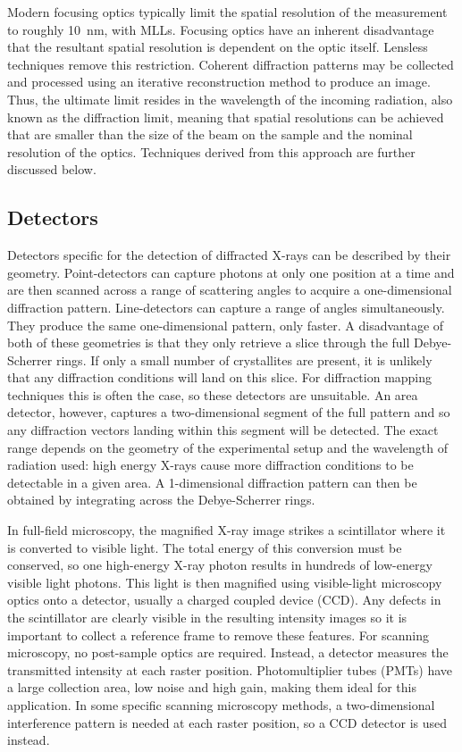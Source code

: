 \documentclass[journal=cmatex,manuscript=perspective]{achemso}
\begin{document}
Modern focusing optics typically limit the spatial resolution of the
measurement to roughly \SI{10}{nm}, with MLLs\cite{yan2014}. Focusing
optics have an inherent disadvantage that the resultant spatial
resolution is dependent on the optic itself. Lensless techniques
remove this restriction. Coherent diffraction patterns may be
collected and processed using an iterative reconstruction method to
produce an image. Thus, the ultimate limit resides in the wavelength
of the incoming radiation, also known as the diffraction limit,
meaning that spatial resolutions can be achieved that are smaller than
the size of the beam on the sample and the nominal resolution of the
optics. Techniques derived from this approach are further discussed
below.

\subsection{Detectors}

Detectors specific for the detection of diffracted X-rays can be
described by their geometry. Point-detectors can capture photons at
only one position at a time and are then scanned across a range of
scattering angles to acquire a one-dimensional diffraction
pattern. Line-detectors can capture a range of angles simultaneously. They produce the same one-dimensional pattern, only faster. A disadvantage of both of these
geometries is that they only retrieve a slice through the full
Debye-Scherrer rings. If only a small number of crystallites are
present, it is unlikely that any diffraction conditions will land on
this slice. For diffraction mapping techniques this is often the case,
so these detectors are unsuitable. An area detector, however, captures
a two-dimensional segment of the full pattern and so any diffraction
vectors landing within this segment will be detected. The exact range
depends on the geometry of the experimental setup and the wavelength
of radiation used: high energy X-rays cause more diffraction
conditions to be detectable in a given area. A 1-dimensional
diffraction pattern can then be obtained by integrating across the
Debye-Scherrer rings.

In full-field microscopy, the magnified X-ray image strikes a
scintillator where it is converted to visible light. The total energy
of this conversion must be conserved, so one high-energy X-ray photon
results in hundreds of low-energy visible light photons. This light is
then magnified using visible-light microscopy optics onto a detector,
usually a charged coupled device (CCD). Any defects in the scintillator are clearly visible in the resulting intensity images so it is important to collect a
reference frame to remove these features. For scanning microscopy, no
post-sample optics are required. Instead, a detector measures the
transmitted intensity at each raster position. Photomultiplier tubes
(PMTs) have a large collection area, low noise and high gain, making
them ideal for this application. In some specific scanning microscopy
methods, a two-dimensional interference pattern is needed at each
raster position, so a CCD detector is used instead.
\end{document}
